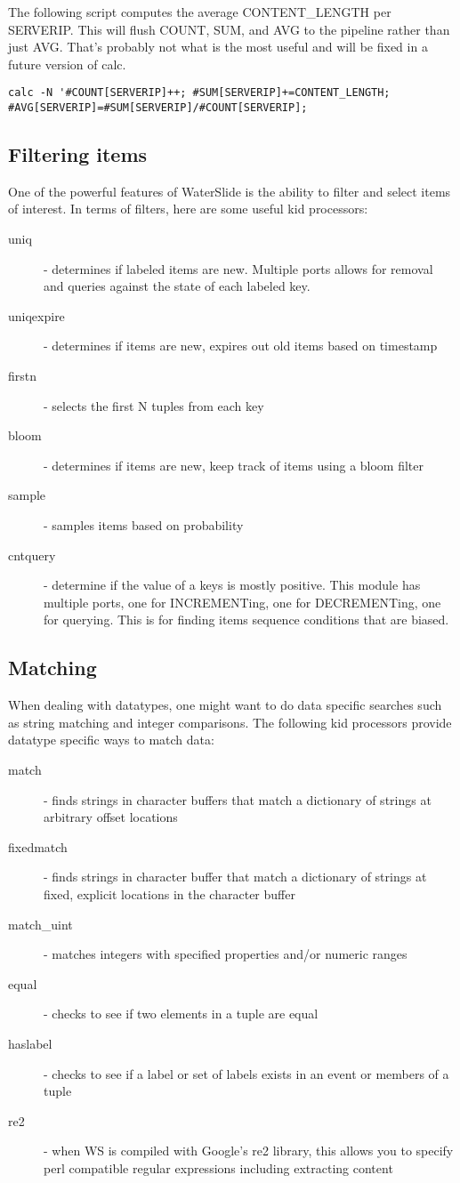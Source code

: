 \documentclass[11pt]{article}
\begin{document}
The following script computes the average CONTENT\_LENGTH per SERVERIP.  This will flush COUNT, 
SUM, and AVG to the pipeline rather than just AVG.  That's probably not what
is the most useful and will be fixed in a future version of calc.

\begin{lstlisting}
calc -N '#COUNT[SERVERIP]++; #SUM[SERVERIP]+=CONTENT_LENGTH; 
#AVG[SERVERIP]=#SUM[SERVERIP]/#COUNT[SERVERIP];
\end{lstlisting}

\subsection {Filtering items}
One of the powerful features of WaterSlide is the ability to filter and select items of interest.  In
terms of filters, here are some useful kid processors: 
\begin{description}
\item [uniq] - determines if labeled items are new.  Multiple ports allows for removal and queries against
the state of each labeled key.
\item [uniqexpire] - determines if items are new, expires out old items based on timestamp 
\item [firstn] - selects the first N tuples from each key
\item [bloom] - determines if items are new, keep track of items using a bloom filter
\item [sample] - samples items based on probability
\item [cntquery] - determine if the value of a keys is mostly positive.  This module has multiple ports, one
for INCREMENTing, one for DECREMENTing, one for querying.  This is for finding items sequence
conditions that are biased.
\end{description}

\subsection {Matching}
When dealing with datatypes, one might want to do data specific searches such as string matching and
integer comparisons.  The following kid processors provide datatype specific ways to match data:
\begin{description}
\item [match] - finds strings in character buffers that match a dictionary of strings at arbitrary
offset locations
\item [fixedmatch] - finds strings in character buffer that match a dictionary of strings at fixed,
explicit locations in the character buffer
\item [match\_uint] - matches integers with specified properties and/or numeric ranges
\item [equal] - checks to see if two elements in a tuple are equal
\item [haslabel] - checks to see if a label or set of labels exists in an event or members of a tuple
\item [re2] - when WS is compiled with Google's re2 library, this allows you to specify perl
compatible regular expressions including extracting content
\end{description}
\end{document}
